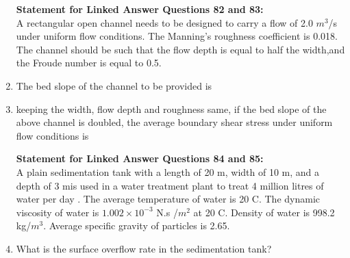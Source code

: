 \documentclass[journal]{IEEEtran}
\begin{document}
\begin{enumerate}[start=74]
\textbf{Statement for Linked Answer Questions 82 and 83:}\\
A rectangular open channel needs to be designed to carry a flow of 2.0 $m^3$/s under uniform flow conditions. The Manning's roughness coefficient is 0.018. The channel should be such that the flow depth is equal to half the width,and the Froude number is equal to 0.5.
\item %
The bed slope of the channel to be provided is
\begin{enumerate}
\end{enumerate}

\item %
keeping the width, flow depth and roughness same, if the bed slope of the above channel is doubled, the average boundary shear stress under uniform flow conditions is 
\begin{enumerate}
\end{enumerate}

\textbf{Statement for Linked Answer Questions 84 and 85:}\\
A plain sedimentation tank with a length of 20 m, width of 10 m, and a depth of 3 mis used in a water treatment plant to treat 4 million litres of water per day . The average temperature of water is 20 \degree C. The dynamic viscosity of water is $1.002 \times 10^{-3}$ N.s /$m^2$ at 20 \degree C. Density of water is 998.2 kg/$m^3$. Average specific gravity of particles is 2.65.

\item %
What is the surface overflow rate in the sedimentation tank?
\begin{enumerate}
\end{enumerate}




\end{enumerate}
\end{document}
